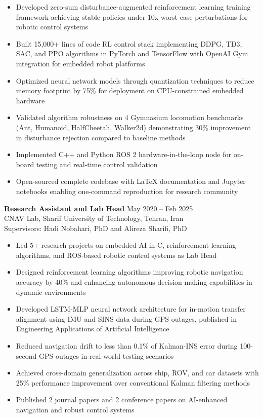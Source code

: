 \documentclass[12pt]{article}
\begin{document}
\begin{itemize} \itemsep 1pt
	\item Developed zero-sum disturbance-augmented reinforcement learning training framework achieving stable policies under 10x worst-case perturbations for robotic control systems
	\item Built 15,000+ lines of code RL control stack implementing DDPG, TD3, SAC, and PPO algorithms in PyTorch and TensorFlow with OpenAI Gym integration for embedded robot platforms
	\item Optimized neural network models through quantization techniques to reduce memory footprint by 75\% for deployment on CPU-constrained embedded hardware
	\item Validated algorithm robustness on 4 Gymnasium locomotion benchmarks (Ant, Humanoid, HalfCheetah, Walker2d) demonstrating 30\% improvement in disturbance rejection compared to baseline methods
	\item Implemented C++ and Python ROS 2 hardware-in-the-loop node for on-board testing and real-time control validation
	\item Open-sourced complete codebase with LaTeX documentation and Jupyter notebooks enabling one-command reproduction for research community
\end{itemize}

\vspace{4pt}

\noindent
\textbf{Research Assistant and Lab Head} \hfill May 2020 -- Feb 2025 \\
CNAV Lab, Sharif University of Technology, Tehran, Iran \\
Supervisors: Hadi Nobahari, PhD and Alireza Sharifi, PhD

\begin{itemize} \itemsep 1pt
	\item Led 5+ research projects on embedded AI in C, reinforcement learning algorithms, and ROS-based robotic control systems as Lab Head
	\item Designed reinforcement learning algorithms improving robotic navigation accuracy by 40\% and enhancing autonomous decision-making capabilities in dynamic environments
	\item Developed LSTM-MLP neural network architecture for in-motion transfer alignment using IMU and SINS data during GPS outages, published in Engineering Applications of Artificial Intelligence
	\item Reduced navigation drift to less than 0.1\% of Kalman-INS error during 100-second GPS outages in real-world testing scenarios
	\item Achieved cross-domain generalization across ship, ROV, and car datasets with 25\% performance improvement over conventional Kalman filtering methods
	\item Published 2 journal papers and 2 conference papers on AI-enhanced navigation and robust control systems
\end{itemize}
\end{document}
